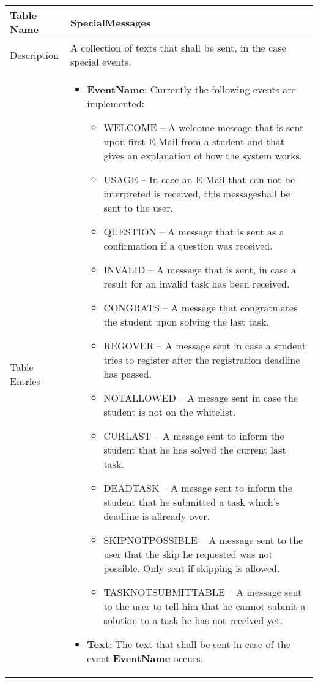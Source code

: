 \begin{tabular}{|p{2.5cm}|p{11cm}|}
\hline
Table Name & SpecialMessages \\
\hline
Description & A collection of texts that shall be sent, in the case special events. \\
\hline
Table Entries & \begin{itemize}
    \item {\bf EventName}: Currently the following events are implemented:
        \begin{itemize}
        \item WELCOME -- A welcome message that is sent upon first E-Mail from a student
			and that gives an explanation of how the system works.
        \item USAGE -- In case an E-Mail that can not be interpreted is received, this
		messageshall be sent to the user.
        \item QUESTION -- A message that is sent as a confirmation if a question was
			received.
        \item INVALID -- A message that is sent, in case a result for an invalid task has
                been received.
        \item CONGRATS -- A message that congratulates the student upon solving the
			last task.
        \item REGOVER -- A message sent in case a student tries to register after the
			registration deadline has passed.
        \item NOTALLOWED -- A mesage sent in case the student is not on the whitelist.
        \item CURLAST -- A mesage sent to inform the student that he has solved the
			current last task.
        \item DEADTASK -- A mesage sent to inform the student that he submitted a task
			which's deadline is allready over.
		\item SKIPNOTPOSSIBLE -- A message sent to the user that the skip he
			requested was not possible. Only sent if skipping is allowed.
		\item TASKNOTSUBMITTABLE -- A message sent to the user to tell him that
			he cannot submit a solution to a task he has not received yet.
        \end{itemize}
        \item {\bf Text}: The text that shall be sent in case of the event {\bf EventName}
			occurs.
    \end{itemize} \\
\hline
\end{tabular}

